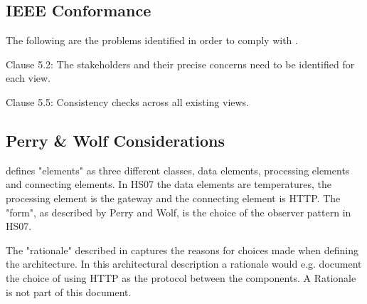 \documentclass[a4paper,10pt]{article}
\begin{document}
\subsection{IEEE Conformance}


The following are the problems identified in order to comply with \cite{ieeerecommendedpractice}.

Clause 5.2: The stakeholders and their precise concerns need to be identified for each view. 

Clause 5.5: Consistency checks across all existing views.

\subsection{Perry \& Wolf Considerations}

\cite{perrywolf1992} defines "elements" as three different classes, data elements,
processing elements and connecting elements. In HS07 the data elements are
temperatures, the processing element is the gateway and the connecting element
is HTTP. The "form", as described by Perry and Wolf, is the choice of the observer
pattern in HS07.

The "rationale" described in \cite{perrywolf1992} captures the reasons for choices
made when defining the architecture. In this architectural description a rationale
would e.g. document the choice of using HTTP as the protocol between the components. A
Rationale is not part of this document.




\end{document}
